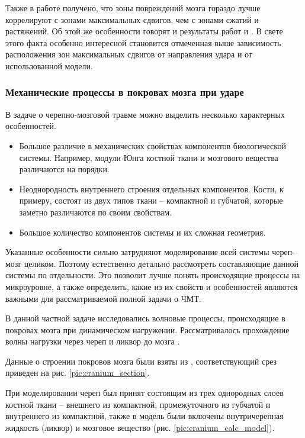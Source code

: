 Также в работе \cite{agapov_diser} получено, что зоны повреждений мозга гораздо лучше коррелируют с зонами максимальных сдвигов, чем с зонами сжатий и растяжений. Об этой же особенности говорят и результаты работ \cite{zhou} и \cite{chu}. В свете этого факта особенно интересной становится отмеченная выше зависимость расположения зон максимальных сдвигов от направления удара и от использованной модели.


\clearpage
\newpage

\subsubsection*{Механические процессы в покровах мозга при ударе}

В задаче о черепно-мозговой травме можно выделить несколько характерных особенностей.

\begin{itemize}

\item Большое различие в механических свойствах компонентов биологической системы. Например, модули Юнга костной ткани и мозгового вещества различаются на порядки.

\item Неоднородность внутреннего строения отдельных компонентов. Кости, к примеру, состоят из двух типов ткани -- компактной и губчатой, которые заметно различаются по своим свойствам.

\item Большое количество компонентов системы и их сложная геометрия.

\end{itemize}

Указанные особенности сильно затрудняют моделирование всей системы череп-мозг целиком. Поэтому естественно детально рассмотреть составляющие данной системы по отдельности. Это позволит лучше понять происходящие процессы на микроуровне, а также определить, какие из их свойств и особенностей являются важными для рассматриваемой полной задачи о ЧМТ.

В данной частной задаче исследовались волновые процессы, происходящие в покровах мозга при динамическом нагружении. Рассматривалось прохождение волны нагрузки через череп и ликвор до мозга \cite{a2}. 

Данные о строении покровов мозга были взяты из \cite{anatomy_atlas}, соответствующий срез приведен на рис. \ref{pic:cranium_section}.

При моделировании череп был принят состоящим из трех однородных слоев костной ткани – внешнего из компактной, промежуточного из губчатой и внутреннего из компактной, также в модель были включены внутричерепная жидкость (ликвор) и мозговое вещество (рис. \ref{pic:cranium_calc_model}).

